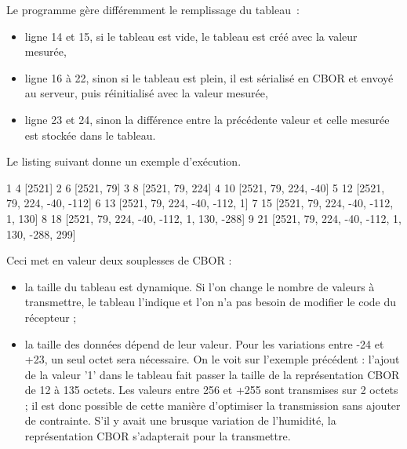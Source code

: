 
Le programme  gère différemment le remplissage du tableau~:

\begin{itemize}
    \item ligne 14 et 15, si le tableau est vide, le tableau est créé avec la valeur mesurée,
    \item ligne 16 à 22, sinon si le tableau est plein, il est sérialisé en CBOR et envoyé au serveur, puis réinitialisé avec la valeur mesurée,
    \item ligne 23 et 24, sinon la différence entre la précédente valeur et celle mesurée est stockée dans le tableau.
\end{itemize}

       \vspace{1em}

Le listing suivant donne un exemple d'exécution.

\begin{termc}[backgroundcolor=\color{palerod}, basicstyle=\ttfamily\small, escapechar=\#]
1 4 [2521]
2 6 [2521, 79]
3 8 [2521, 79, 224]
4 10 [2521, 79, 224, -40]
5 12 [2521, 79, 224, -40, -112]
6 13 [2521, 79, 224, -40, -112, 1]
7 15 [2521, 79, 224, -40, -112, 1, 130]
8 18 [2521, 79, 224, -40, -112, 1, 130, -288]
9 21 [2521, 79, 224, -40, -112, 1, 130, -288, 299]
\end{termc}

Ceci met en valeur deux souplesses de CBOR :
\begin{itemize}
    \item la taille du tableau est dynamique. Si l’on change le nombre de valeurs à transmettre, le tableau l’indique et l’on n’a pas besoin de modifier le code du récepteur ;
    \item la taille des données dépend de leur valeur. 
    Pour les variations entre -24 et +23, un seul octet sera nécessaire. 
    On le voit sur l’exemple précédent : l’ajout de la valeur '1' dans le tableau fait passer la taille de la représentation CBOR de 12 à 135 octets. Les valeurs entre 256 et +255 sont transmises sur 2 octets ; il est donc possible de cette manière d’optimiser la transmission sans ajouter de contrainte. S’il y avait une brusque variation de l’humidité, la représentation CBOR s’adapterait pour la transmettre.
\end{itemize}

